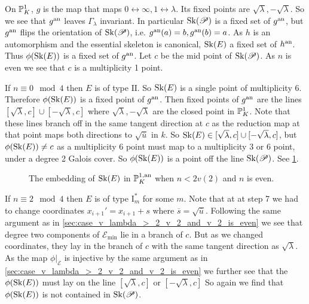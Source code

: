 On $\mathbb{P}^{1}_K$, $g$ is the map that maps $0 \leftrightarrow \infty, 1 \leftrightarrow \lambda$. 
Its fixed points are $\sqrt{\lambda}, -\sqrt{\lambda}$. 
So we see that $g{}^{\text{an}}$ leaves $\Gamma_\lambda$ invariant. In particular $\operatorname{Sk}(\mathscr P)$ is a fixed set of $g{}^{\text{an}}$, but $g{}^{\text{an}}$ flips the orientation of $\operatorname{Sk}(\mathscr P)$, i.e. $g{}^{\text{an}}(a) = b, g{}^{\text{an}}(b) = a$. 
As $h$ is an automorphism and the essential skeleton is canonical, $\operatorname{Sk}(E)$ a fixed set of $h{}^{\text{an}}$. 
Thus $\phi(\sk(E))$ is a fixed set of $g{}^{\text{an}}$.
Let $c$ be the mid point of $\operatorname{Sk}(\mathscr P)$. 
As $n$ is even we see that $c$ is a multiplicity 1 point. 

\medskip

If  $n \equiv 0 \mod 4$ then $E$ is of type $\mathrm{II}$.  
So $\operatorname{Sk}(E)$ is a single point of multiplicity 6. 
Therefore  $\phi(\sk(E))$ is a fixed point of $g{}^{\text{an}}$. 
Then fixed points of $g{}^{\text{an}}$ are the lines  $[\sqrt{\lambda}, c] \cup [-\sqrt{\lambda} , c]$ where $\sqrt{\lambda}, -\sqrt{\lambda}$ are the closed point in $\mathbb{P}^{1}_K$. 
Note that these lines branch off in the same tangent direction at $c$ as the reduction map at that point maps both directions to  $\sqrt{\overline{u}} $ in $k$. 
So $\operatorname{Sk}(E) \in [\sqrt{\lambda}, c] \cup [-\sqrt{\lambda}, c] $, but $\phi(\sk(E)) \ne c$ as a multiplicity 6 point must map to a multiplicity 3 or 6 point, under a degree 2 Galois cover. 
So $\phi(\sk(E))$ is a point off the line $\operatorname{Sk}(\mathscr P)$. 
See \cref{fig:image_skeleton_wild_n_le_2v2_n_even}. 

\begin{figure}[h]
    \centering
    \caption{The embedding of $\operatorname{Sk}(E)$ in $\mathbb{P}^{1, \text{an}}_K$ when $n < 2v(2)$ and  $n$ is even.}
    \label{fig:image_skeleton_wild_n_le_2v2_n_even}
\end{figure}
\medskip 
If $n \equiv 2 \mod 4$ then $E$ is of type $\mathrm I_{m}^*$ for some $m$. 
Note that at at step 7 we had to change coordinates $x_{i+1}' = x_{i + 1}  + s$ where $\overline{s} = \sqrt{\overline{u}} $. 
Following the same argument as in \cref{sec:case_v_lambda_>_2_v_2_and_v_2_is_even} we see that degree two components of $\mathscr E_\text{min} $ lie in a branch of $c$. 
But as we changed coordinates, they lay in the branch of $c$ with the same tangent direction as $\sqrt{\lambda} $. 
As the map $\phi|_{\mathscr E}$ is injective by the same argument as in \cref{sec:case_v_lambda_>_2_v_2_and_v_2_is_even} we further see that the $\phi(\sk(E))$ must lay on the line $[\sqrt{\lambda}, c] $ or $[-\sqrt{\lambda} , c]$
So again we find that $\phi(\sk (E))$ is not contained in $\operatorname{Sk}(\mathscr P)$. 


